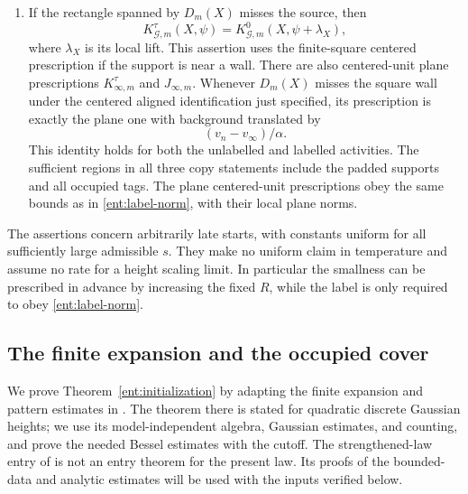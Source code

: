 \begin{theorem}
\begin{enumerate}
\item If the rectangle spanned by \(D_m(X)\) misses the source, then
\begin{equation}\label{ent:translated-copy}
 K_{\mathcal G,m}^\tau(X,\psi)
             =K_{\mathcal G,m}^0(X,\psi+\lambda_X),
\end{equation}
where \(\lambda_X\) is its local lift.  This assertion uses the
finite-square centered prescription if the support is near a wall.
There are also centered-unit plane prescriptions \(K_{\infty,m}^\tau\)
and \(J_{\infty,m}\).  Whenever \(D_m(X)\) misses the square wall
under the centered aligned identification just specified, its
prescription is exactly the plane one with background translated by
\begin{equation}\label{ent:plane-background}
                         (v_n-v_\infty)/\alpha .
\end{equation}
This identity holds for both the unlabelled and labelled activities.
The sufficient regions in all three copy statements include the
padded supports and all occupied tags.  The plane centered-unit
prescriptions obey the same bounds as in \eqref{ent:label-norm},
with their local plane norms.
\end{enumerate}
\end{theorem}

The assertions concern arbitrarily late starts, with constants
uniform for all sufficiently large admissible \(s\).  They make no
uniform claim in temperature and assume no rate for a height
scaling limit.  In particular the smallness can be prescribed in
advance by increasing the fixed \(R\), while the label is only
required to obey \eqref{ent:label-norm}.

\subsection{The finite expansion and the occupied cover}

We prove Theorem~\ref{ent:initialization} by adapting the finite
expansion and pattern estimates in \cite[Section~9]{B}.
The theorem there is stated for quadratic discrete Gaussian heights;
we use its model-independent algebra, Gaussian estimates, and
counting, and prove the needed Bessel estimates with the cutoff.
The strengthened-law entry of \cite[Section~5]{C} is not an entry
theorem for the present law.  Its proofs of the bounded-data and
analytic estimates will be used with the inputs verified below.


